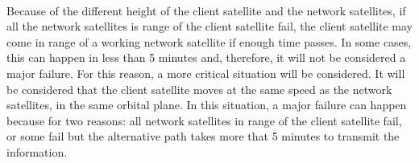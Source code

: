 \documentclass[12pt,a4paper]{report}
\begin{document}
\paragraph{}Because of the different height of the client satellite and the network satellites, if all the network satellites is range of the client satellite fail, the client satellite may come in range of a working network satellite if enough time passes. In some cases, this can happen in less than 5 minutes and, therefore, it will not be considered a major failure. For this reason, a more critical situation will be considered. It will be considered that the client satellite moves at the same speed as the network satellites, in the same orbital plane. In this situation, a major failure can happen because for two reasons: all network satellites in range of the client satellite fail, or some fail but the alternative path takes more that 5 minutes to transmit the information.
\end{document}
